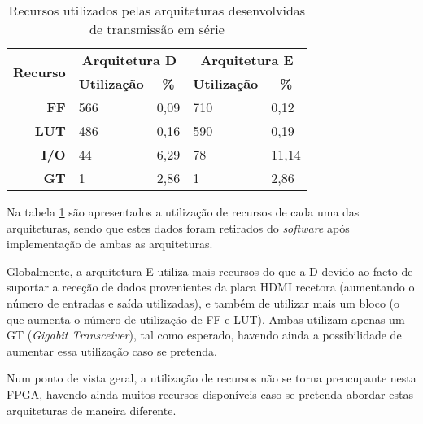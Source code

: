\begin{table}[h!]
	\centering
	\caption{Recursos utilizados pelas arquiteturas desenvolvidas de transmissão em série}
	\label{table:recursos_planoD_planoE}

		\begin{tabular}{rllll}
			\hline
			\multicolumn{1}{c}{\multirow{2}{*}{\textbf{Recurso}}} & \multicolumn{2}{c}{\textbf{Arquitetura D}}                                 & \multicolumn{2}{c}{\textbf{Arquitetura E}}                               \\ \cline{2-5} 
			\multicolumn{1}{c}{}                                  & \multicolumn{1}{c}{\textbf{Utilização}} & \multicolumn{1}{c|}{\textbf{\%}} & \multicolumn{1}{c}{\textbf{Utilização}} & \multicolumn{1}{c}{\textbf{\%}} \\ \hline
			\multicolumn{1}{r|}{\textbf{FF}}                      & 566                                     & \multicolumn{1}{l|}{0,09}        & 710                                    & 0,12                            \\
			\multicolumn{1}{r|}{\textbf{LUT}}                     & 486                                     & \multicolumn{1}{l|}{0,16}        & 590                                    & 0,19                            \\
			\multicolumn{1}{r|}{\textbf{I/O}}                     & 44                                      & \multicolumn{1}{l|}{6,29}        & 78                                     & 11,14                           \\
			\multicolumn{1}{r|}{\textbf{GT}}                      & 1                                       & \multicolumn{1}{l|}{2,86}        & 1                                      & 2,86                            \\ \hline
		\end{tabular}%
\end{table}

Na tabela \ref{table:recursos_planoD_planoE} são apresentados a utilização de recursos de cada uma das arquiteturas, sendo que estes dados foram retirados do \textit{software} após implementação de ambas as arquiteturas.

Globalmente, a arquitetura E utiliza mais recursos do que a D devido ao facto de suportar a receção de dados provenientes da placa HDMI recetora (aumentando o número de entradas e saída utilizadas), e também de utilizar mais um bloco (o que aumenta o número de utilização de FF e LUT). Ambas utilizam apenas um GT (\textit{Gigabit Transceiver}), tal como esperado, havendo ainda a possibilidade de aumentar essa utilização caso se pretenda.

Num ponto de vista geral, a utilização de recursos não se torna preocupante nesta FPGA, havendo ainda muitos recursos disponíveis caso se pretenda abordar estas arquiteturas de maneira diferente.